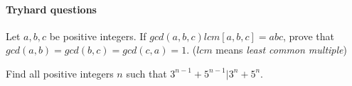 \documentclass{exam}
\begin{document}
\paragraph{Tryhard questions}
\begin{questions}
\question Let $a,b,c$ be positive integers. If $gcd(a,b,c)lcm[a,b,c] =abc$, prove that $gcd(a,b) = gcd(b,c) = gcd(c,a) = 1$. ($lcm$ means \textit{least common multiple})

\question Find all positive integers $n$ such that $3^{n-1} + 5^{n-1}|3^n + 5^n$.

\end{questions}
\end{document}
